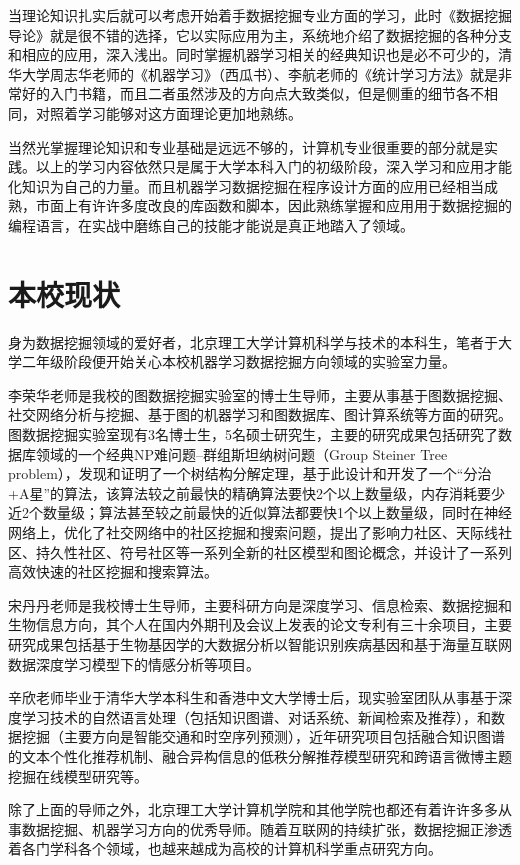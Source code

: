 \documentclass{elegantpaper}
\begin{document}
当理论知识扎实后就可以考虑开始着手数据挖掘专业方面的学习，此时《数据挖掘导论》就是很不错的选择，它以实际应用为主，系统地介绍了数据挖掘的各种分支和相应的应用，深入浅出。同时掌握机器学习相关的经典知识也是必不可少的，清华大学周志华老师的《机器学习》（西瓜书）、李航老师的《统计学习方法》就是非常好的入门书籍，而且二者虽然涉及的方向点大致类似，但是侧重的细节各不相同，对照着学习能够对这方面理论更加地熟练。

当然光掌握理论知识和专业基础是远远不够的，计算机专业很重要的部分就是实践。以上的学习内容依然只是属于大学本科入门的初级阶段，深入学习和应用才能化知识为自己的力量。而且机器学习数据挖掘在程序设计方面的应用已经相当成熟，市面上有许许多度改良的库函数和脚本，因此熟练掌握和应用用于数据挖掘的编程语言，在实战中磨练自己的技能才能说是真正地踏入了领域。

\section{本校现状}

身为数据挖掘领域的爱好者，北京理工大学计算机科学与技术的本科生，笔者于大学二年级阶段便开始关心本校机器学习数据挖掘方向领域的实验室力量。

李荣华老师是我校的图数据挖掘实验室的博士生导师，主要从事基于图数据挖掘、社交网络分析与挖掘、基于图的机器学习和图数据库、图计算系统等方面的研究。图数据挖掘实验室现有3名博士生，5名硕士研究生，主要的研究成果包括研究了数据库领域的一个经典NP难问题--群组斯坦纳树问题（Group Steiner Tree problem），发现和证明了一个树结构分解定理，基于此设计和开发了一个“分治+A星”的算法，该算法较之前最快的精确算法要快2个以上数量级，内存消耗要少近2个数量级；算法甚至较之前最快的近似算法都要快1个以上数量级，同时在神经网络上，优化了社交网络中的社区挖掘和搜索问题，提出了影响力社区、天际线社区、持久性社区、符号社区等一系列全新的社区模型和图论概念，并设计了一系列高效快速的社区挖掘和搜索算法。

宋丹丹老师是我校博士生导师，主要科研方向是深度学习、信息检索、数据挖掘和生物信息方向，其个人在国内外期刊及会议上发表的论文专利有三十余项目，主要研究成果包括基于生物基因学的大数据分析以智能识别疾病基因和基于海量互联网数据深度学习模型下的情感分析等项目。

辛欣老师毕业于清华大学本科生和香港中文大学博士后，现实验室团队从事基于深度学习技术的自然语言处理（包括知识图谱、对话系统、新闻检索及推荐），和数据挖掘（主要方向是智能交通和时空序列预测），近年研究项目包括融合知识图谱的文本个性化推荐机制、融合异构信息的低秩分解推荐模型研究和跨语言微博主题挖掘在线模型研究等。

除了上面的导师之外，北京理工大学计算机学院和其他学院也都还有着许许多多从事数据挖掘、机器学习方向的优秀导师。随着互联网的持续扩张，数据挖掘正渗透着各门学科各个领域，也越来越成为高校的计算机科学重点研究方向。
\end{document}
